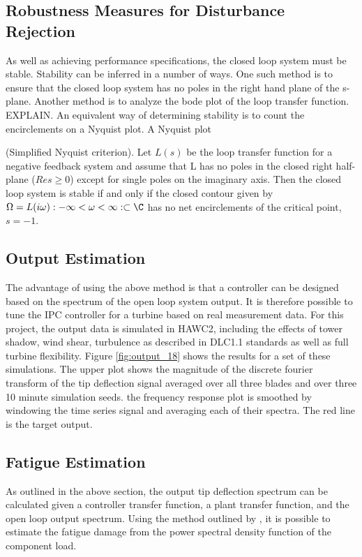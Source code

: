 \subsection{Robustness Measures for Disturbance Rejection}
As well as achieving performance specifications, the closed loop system must be stable. Stability can be inferred in a number of ways. One such method is to ensure that the closed loop system has no poles in the right hand plane of the s-plane. Another method is to analyze the bode plot of the loop transfer function. EXPLAIN. An equivalent way of determining stability is to count the encirclements on a Nyquist plot. A Nyquist plot 
\begin{theorem}
(Simplified Nyquist criterion). Let $L(s)$ be the loop transfer function for a negative feedback system and assume that L has no poles in the closed right half-plane ($Res \ge 0$) except for single poles on the imaginary axis. Then the closed loop system is stable if and only if the closed contour given by $\Omega = {L(i\omega):-\infty < \omega < \infty}:\subset \C$ has no net encirclements of the critical point, $s = -1$.
\end{theorem}



\subsection{Output Estimation}
The advantage of using the above method is that a controller can be designed based on the spectrum of the open loop system output. It is therefore possible to tune the IPC controller for a turbine based on real measurement data. For this project, the output data is simulated in HAWC2, including the effects of tower shadow, wind shear, turbulence as described in DLC1.1 standards as well as full turbine flexibility. Figure \ref{fig:output_18} shows the results for a set of these simulations. The upper plot shows the magnitude of the discrete fourier transform of the tip deflection signal averaged over all three blades and over three 10 minute simulation seeds. the frequency response plot is smoothed by windowing the time series signal and averaging each of their spectra. The red line is the target output.  

\subsection{Fatigue Estimation}
As outlined in the above section, the output tip deflection spectrum can be calculated given a controller transfer function, a plant transfer function, and the open loop output spectrum. Using the method outlined by \cite{21_benasciutti2006comparison}, it is possible to estimate the fatigue damage from the power spectral density function of the component load.

